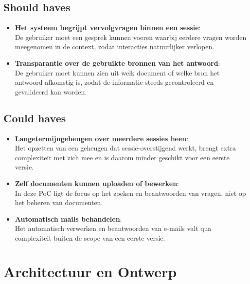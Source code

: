 \subsection{Should haves}
\begin{itemize}
    \item \textbf{Het systeem begrijpt vervolgvragen binnen een sessie}:\\  
    De gebruiker moet een gesprek kunnen voeren waarbij eerdere vragen worden meegenomen in de context, zodat interacties natuurlijker verlopen.
    \item \textbf{Transparantie over de gebruikte bronnen van het antwoord}:\\  
    De gebruiker moet kunnen zien uit welk document of welke bron het antwoord afkomstig is, zodat de informatie steeds gecontroleerd en gevalideerd kan worden.
\end{itemize}

\subsection{Could haves}
\begin{itemize}
    \item \textbf{Langetermijngeheugen over meerdere sessies heen}:\\  
    Het opzetten van een geheugen dat sessie-overstijgend werkt, brengt extra complexiteit met zich mee en is daarom minder geschikt voor een eerste versie.
    \item \textbf{Zelf documenten kunnen uploaden of bewerken}:\\  
    In deze PoC ligt de focus op het zoeken en beantwoorden van vragen, niet op het beheren van documenten.
    \item \textbf{Automatisch mails behandelen}:\\  
    Het automatisch verwerken en beantwoorden van e-mails valt qua complexiteit buiten de scope van een eerste versie.
\end{itemize}

\section{Architectuur en Ontwerp}

